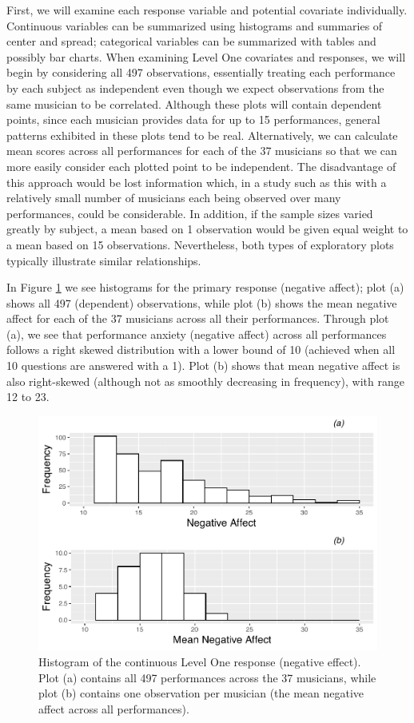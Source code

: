 \documentclass[
]{krantz}
\begin{document}
First, we will examine each response variable and potential covariate individually. Continuous variables can be summarized using histograms and summaries of center and spread; categorical variables can be summarized with tables and possibly bar charts. When examining Level One covariates and responses, we will begin by considering all 497 observations, essentially treating each performance by each subject as independent even though we expect observations from the same musician to be correlated. Although these plots will contain dependent points, since each musician provides data for up to 15 performances, general patterns exhibited in these plots tend to be real. Alternatively, we can calculate mean scores across all performances for each of the 37 musicians so that we can more easily consider each plotted point to be independent. The disadvantage of this approach would be lost information which, in a study such as this with a relatively small number of musicians each being observed over many performances, could be considerable. In addition, if the sample sizes varied greatly by subject, a mean based on 1 observation would be given equal weight to a mean based on 15 observations. Nevertheless, both types of exploratory plots typically illustrate similar relationships.

In Figure \ref{fig:mli-hist1} we see histograms for the primary response (negative affect); plot (a) shows all 497 (dependent) observations, while plot (b) shows the mean negative affect for each of the 37 musicians across all their performances. Through plot (a), we see that performance anxiety (negative affect) across all performances follows a right skewed distribution with a lower bound of 10 (achieved when all 10 questions are answered with a 1). Plot (b) shows that mean negative affect is also right-skewed (although not as smoothly decreasing in frequency), with range 12 to 23.

\begin{figure}

{\centering \includegraphics[width=0.6\linewidth]{bookdown-BeyondMLR_files/figure-latex/mli-hist1-1} 

}

\caption{Histogram of the continuous Level One response (negative effect). Plot (a) contains all 497 performances across the 37 musicians, while plot (b) contains one observation per musician (the mean negative affect across all performances).}\label{fig:mli-hist1}
\end{figure}
\end{document}
